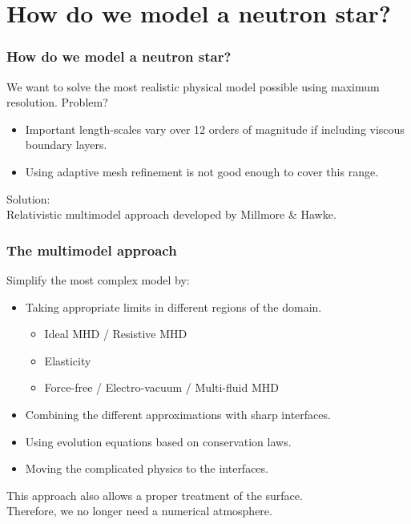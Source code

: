 \documentclass{beamer}
\begin{document}


\section{How do we model a neutron star?}
\begin{frame}
\frametitle{How do we model a neutron star?}
We want to solve the most realistic physical model possible using maximum resolution. Problem?
\begin{itemize}
\item{Important length-scales vary over 12 orders of magnitude if including viscous boundary layers.}
\item{Using adaptive mesh refinement is not good enough to cover this range.}
\end{itemize}
Solution: \\
Relativistic multimodel approach developed by Millmore \& Hawke.
\end{frame}

\begin{frame}
\frametitle{The multimodel approach}
Simplify the most complex model by:
\begin{itemize}
\item{Taking appropriate limits in different regions of the domain.}
\begin{itemize}
\item{Ideal MHD / Resistive MHD}
\item{Elasticity}
\item{Force-free / Electro-vacuum / Multi-fluid MHD}
\end{itemize}
\item{Combining the different approximations with sharp interfaces.}
\item{Using evolution equations based on conservation laws.}
\item{Moving the complicated physics to the interfaces.}
\end{itemize}
This approach also allows a proper treatment of the surface. \\
Therefore, we no longer need a numerical atmosphere. 
\end{frame}
\end{document}
